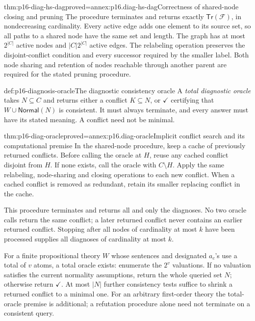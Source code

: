 \begin{hbtheorem}{thm:p16-diag-hs-dag}{proved=annex:p16.diag-hs-dag}{Correctness of shared-node closing and pruning}
The procedure terminates and returns exactly
\(\mathsf{Tr}(\mathcal F)\), in nondecreasing cardinality.
Every active edge adds one element to its source set, so
all paths to a shared node have the same set and length.
The graph has at most \(2^{|C|}\) active nodes and
\(|C|2^{|C|}\) active edges.
The relabeling operation preserves the disjoint-conflict
condition and every successor required by the smaller label.
Both node sharing and retention of nodes reachable through
another parent are required for the stated pruning procedure.
\end{hbtheorem}

\begin{hbdefinition}{def:p16-diagnosis-oracle}{The diagnostic consistency oracle}
A \emph{total diagnostic oracle} takes \(N\subseteq C\) and
returns either a conflict \(K\subseteq N\), or
\(\checkmark\) certifying that \(W\cup\mathsf{Normal}(N)\)
is consistent. It must always terminate, and every answer must
have its stated meaning. A conflict need not be minimal.
\end{hbdefinition}

\begin{hbtheorem}{thm:p16-diag-oracle}{proved=annex:p16.diag-oracle}{Implicit conflict search and its computational premise}
In the shared-node procedure, keep a cache of previously
returned conflicts. Before calling the oracle at \(H\), reuse
any cached conflict disjoint from \(H\). If none exists, call
the oracle with \(C\setminus H\). Apply the same relabeling,
node-sharing and closing operations to each new conflict.
When a cached conflict is removed as redundant, retain its
smaller replacing conflict in the cache.

This procedure terminates and returns all and only the
diagnoses. No two oracle calls return the same conflict;
a later returned conflict never contains an earlier returned
conflict. Stopping after all nodes of cardinality at most
\(k\) have been processed supplies all diagnoses of
cardinality at most \(k\).

For a finite propositional theory \(W\) whose sentences and
designated \(a_c\)'s use a total of \(v\) atoms, a total
oracle exists: enumerate the \(2^v\) valuations. If no
valuation satisfies the current normality assumptions,
return the whole queried set \(N\); otherwise return
\(\checkmark\). At most \(|N|\) further consistency tests
suffice to shrink a returned conflict to a minimal one.
For an arbitrary first-order theory the total-oracle premise
is additional; a refutation procedure alone need not terminate
on a consistent query.
\end{hbtheorem}

